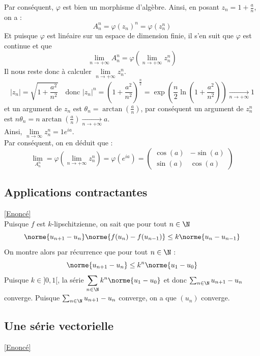 \documentclass{book}
\begin{document}
	Par conséquent, $\varphi$ est bien un morphisme d'algèbre.
	Ainsi, en posant $\displaystyle z_n=1+\frac{a}{n}$, on a :
	\[A_n^n=\varphi(z_n)^n=\varphi(z_n^n)\]
	Et puisque $\varphi$ est linéaire sur un espace de dimension finie, il s'en suit que $\varphi$ est continue et que \[\lim\limits_{n\to+\infty}A_n^n=\varphi\left(\lim\limits_{n\to+\infty}z_n^n\right)\]
	Il nous reste donc à calculer $\lim\limits_{n\to+\infty}z_n^n$.\\
	\[|z_n|=\sqrt{1+\frac{a^2}{n^2}}\quad\text{donc }|z_n|^n=\left(1+\frac{a^2}{n^2}\right)^\frac{n}{2}=\exp(\frac{n}{2}\ln\left(1+\frac{a^2}{n^2}\right))\underset{n\to+\infty}{\longrightarrow}1\]
	et un argument de $z_n$ est $\theta_n=\arctan\left(\frac{a}{n}\right)$, par conséquent un argument de $z_n^n$ est $n\theta_n=n\arctan\left(\frac{a}{n}\right)\underset{n\to+\infty}{\longrightarrow}a$.\\
	Ainsi, $\lim\limits_{n\to\infty}z_n^n=1e^{ia}$.\\
	Par conséquent, on en déduit que :
	\[\lim\limits_{A_n^n}=\varphi\left(\lim\limits_{n\to+\infty}z_n^n\right)=\varphi(e^{ia})=\begin{pmatrix}
		\cos(a)&-\sin(a)\\ \sin(a)&\cos(a)
	\end{pmatrix}\]
	\subsection{Applications contractantes}\label{sec:applications-contractantes}
		\textcolor{blue}{\hyperref[Application contractantes]{[Enoncé]}}\\
		Puisque $f$ est $k$-lipschitzienne, on sait que pour tout $n\in\N$
		\[\norme{u_{n+1}-u_n}\norme{f(u_n)-f(u_{n-1})}\leq k\norme{u_n-u_{n-1}}\]
		On montre alors par récurrence que pour tout $n\in\N$ :
		\[\norme{u_{n+1}-u_n}\leq k^n\norme{u_1-u_0}\]
		Puisque $k\in]0,1[$, la série $\displaystyle \sum_{n\in\N}k^n\norme{u_1-u_0}$ et donc $\sum_{n\in\N}u_{n+1}-u_n$ converge.
		Puisque $\sum_{n\in\N}u_{n+1}-u_n$ converge, on a que $(u_n)$ converge.
	\subsection{Une série vectorielle}\label{sec:une-serie-vectorielle}
		\textcolor{blue}{\hyperref[Une série vectorielle]{[Enoncé]}}\\
\end{document}
